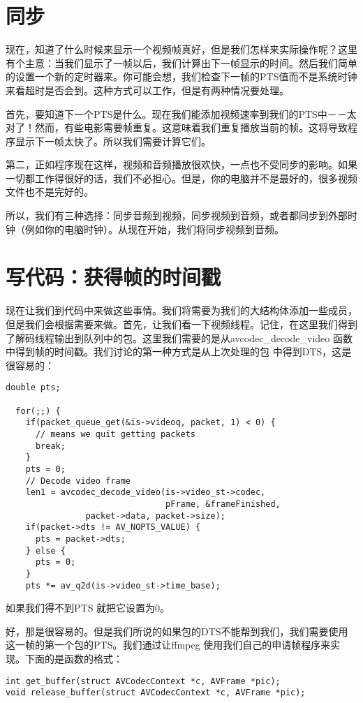 \section{同步}

现在，知道了什么时候来显示一个视频帧真好，但是我们怎样来实际操作呢？这里有个主意：当我们显示了一帧以后，我们计算出下一帧显示的时间。然后我们简单 的设置一个新的定时器来。你可能会想，我们检查下一帧的PTS值而不是系统时钟来看超时是否会到。这种方式可以工作，但是有两种情况要处理。

首先，要知道下一个PTS是什么。现在我们能添加视频速率到我们的PTS中－－太对了！然而，有些电影需要帧重复。这意味着我们重复播放当前的帧。这将导致程序显示下一帧太快了。所以我们需要计算它们。

第二，正如程序现在这样，视频和音频播放很欢快，一点也不受同步的影响。如果一切都工作得很好的话，我们不必担心。但是，你的电脑并不是最好的，很多视频文件也不是完好的。

所以，我们有三种选择：同步音频到视频，同步视频到音频，或者都同步到外部时钟（例如你的电脑时钟）。从现在开始，我们将同步视频到音频。
\section{写代码：获得帧的时间戳}
现在让我们到代码中来做这些事情。我们将需要为我们的大结构体添加一些成员，但是我们会根据需要来做。首先，让我们看一下视频线程。记住，在这里我们得到 了解码线程输出到队列中的包。这里我们需要的是从avcodec_decode_video 函数中得到帧的时间戳。我们讨论的第一种方式是从上次处理的包 中得到DTS，这是很容易的：

\begin{lstlisting}
double pts;

  for(;;) {
    if(packet_queue_get(&is->videoq, packet, 1) < 0) {
      // means we quit getting packets
      break;
    }
    pts = 0;
    // Decode video frame
    len1 = avcodec_decode_video(is->video_st->codec,
                                pFrame, &frameFinished,
                packet->data, packet->size);
    if(packet->dts != AV_NOPTS_VALUE) {
      pts = packet->dts;
    } else {
      pts = 0;
    }
    pts *= av_q2d(is->video_st->time_base);
\end{lstlisting}

如果我们得不到PTS 就把它设置为0。

好，那是很容易的。但是我们所说的如果包的DTS不能帮到我们，我们需要使用这一帧的第一个包的PTS。我们通过让ffmpeg 使用我们自己的申请帧程序来实现。下面的是函数的格式：


\begin{lstlisting}
int get_buffer(struct AVCodecContext *c, AVFrame *pic);
void release_buffer(struct AVCodecContext *c, AVFrame *pic);
\end{lstlisting}

